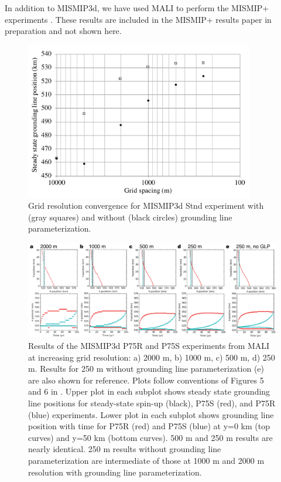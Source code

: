 In addition to MISMIP3d, we have used MALI to perform the MISMIP+ experiments \citep{Asay-Davis2016}.  
These results are included in the MISMIP+ results paper in preparation and not shown here.


\begin{figure}[t]
\centering
\includegraphics[width=10.0cm]{landice/figures/MISMIP3d_Stnd_convergence_plot.pdf}
\caption{
Grid resolution convergence for MISMIP3d Stnd experiment with (gray squares) and without (black circles) grounding line parameterization.
}
\label{mismip-convergence}
\end{figure}

\begin{figure}[t]
\centering
\includegraphics[width=16.0cm]{landice/figures/mismip3d.png}
\caption{
Results of the MISMIP3d P75R and P75S experiments from MALI at increasing grid resolution:
a) 2000 m, b) 1000 m, c) 500 m, d) 250 m.
Results for 250 m without grounding line parameterization (e) are also shown for reference.
Plots follow conventions of Figures 5 and 6 in \citet{pattyn2013}.
Upper plot in each subplot shows steady state grounding line positions for steady-state spin-up (black), P75S (red), and P75R (blue) experiments.
Lower plot in each subplot shows grounding line position with time for P75R (red) and P75S (blue) at y=0 km (top curves) and y=50 km (bottom curves).
500 m and 250 m results are nearly identical.  
250 m results without grounding line parameterization are intermediate of those at 1000 m and 2000 m resolution with grounding line parameterization.
}
\label{mismip-p75}
\end{figure}
